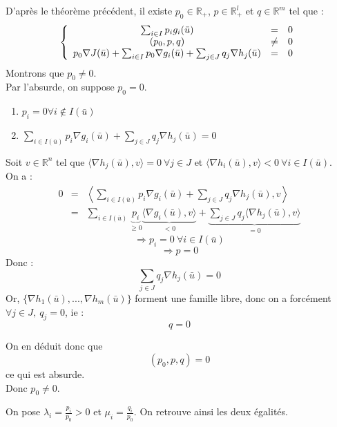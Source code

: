 \begin{dem}
D'après le théorème précédent, il existe $p_0\in\mathbb{R}_+$, $p\in\mathbb{R}^l_+$ et $q\in\mathbb{R}^m$ tel que :
\[\left\{\begin{array}{c c c }
\sum_{i\in I} p_ig_i(\bar{u})&=&0 \\
(p_0,p,q)&\neq& 0 \\
p_0\nabla J(\bar{u})+\sum_{i\in I} p_0 \nabla g_i(\bar{u}) + \sum_{j\in J} q_j \nabla h_j(\bar{u})&=&0 
\end{array}\right.\]
Montrons que $p_0\neq 0$.\\
Par l'absurde, on suppose $p_0=0$.
\begin{enumerate}
	\item $p_i=0 \forall i\not\in I(\bar{u})$
	\item $\sum_{i\in I(\bar{u})} p_i \nabla g_i(\bar{u}) + \sum_{j\in J} q_j \nabla h_j(\bar{u})=0$
\end{enumerate}
Soit $v\in\mathbb{R}^n$ tel que $\langle \nabla h_j(\bar{u}),v\rangle=0\ \forall j\in J$ et $\langle \nabla h_i(\bar{u}),v\rangle<0\ \forall i\in I(\bar{u})$.\\
On a :
\begin{eqnarray*}
0&=&\left\langle \sum_{i\in I(\bar{u})} p_i \nabla g_i(\bar{u}) + \sum_{j\in J} q_j \nabla h_j(\bar{u}),v\right\rangle \\
 &=&\sum_{i\in I(\bar{u})} \underbrace{p_i}_{\geq 0} \underbrace{\langle \nabla g_i(\bar{u}), v\rangle}_{<0} + \underbrace{\sum_{j\in J} q_j\langle \nabla h_j(\bar{u}),v\rangle}_{=0}
\end{eqnarray*}
\[\Rightarrow p_i=0\ \forall i\in I(\bar{u})\]
\[\Rightarrow p=0\]
Donc :
\[\sum_{j\in J} q_j \nabla h_j(\bar{u})=0\]
Or, $\{\nabla h_1(\bar{u}),...,\nabla h_m(\bar{u})\}$ forment une famille libre, donc on a forcément $\forall j\in J,\ q_j=0$, ie : \[q=0\]

On en déduit donc que \[(p_0,p,q)=0\] ce qui est absurde.\\
Donc $p_0\neq 0$.

\bigskip
On pose $\lambda_i=\frac{p_i}{p_0}>0$ et $\mu_i=\frac{q_i}{p_0}$. On retrouve ainsi les deux égalités.
\end{dem}


